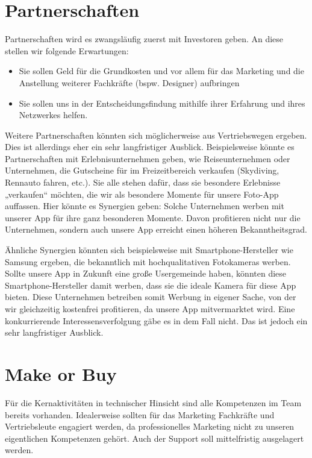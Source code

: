 \section{Partnerschaften}
Partnerschaften wird es zwangsläufig zuerst mit Investoren geben. An diese stellen wir folgende Erwartungen:
\begin{itemize}
\item Sie sollen Geld für die Grundkosten und vor allem für das Marketing und die Anstellung weiterer Fachkräfte (bspw. Designer) aufbringen
\item Sie sollen uns in der Entscheidungsfindung mithilfe ihrer Erfahrung und ihres Netzwerkes helfen.
\end{itemize}

Weitere Partnerschaften könnten sich möglicherweise aus Vertriebswegen ergeben. Dies ist allerdings eher ein sehr langfristiger Ausblick. Beispielsweise könnte es Partnerschaften mit Erlebnisunternehmen geben, wie Reiseunternehmen oder Unternehmen, die Gutscheine für im Freizeitbereich verkaufen (Skydiving, Rennauto fahren, etc.). Sie alle stehen dafür, dass sie besondere Erlebnisse „verkaufen“ möchten, die wir als besondere Momente für unsere Foto-App auffassen. Hier könnte es Synergien geben: Solche Unternehmen werben mit unserer App für ihre ganz besonderen Momente. Davon profitieren nicht nur die Unternehmen, sondern auch unsere App erreicht einen höheren Bekanntheitsgrad.

Ähnliche Synergien könnten sich beispielsweise mit Smartphone-Hersteller wie Samsung ergeben, die bekanntlich mit hochqualitativen Fotokameras werben. Sollte unsere App in Zukunft eine große Usergemeinde haben, könnten diese Smartphone-Hersteller damit werben, dass sie die ideale Kamera für diese App bieten. Diese Unternehmen betreiben somit Werbung in eigener Sache, von der wir gleichzeitig kostenfrei profitieren, da unsere App mitvermarktet wird. Eine konkurrierende Interessensverfolgung gäbe es in dem Fall nicht. Das ist jedoch ein sehr langfristiger Ausblick.


\section{Make or Buy}
Für die Kernaktivitäten in technischer Hinsicht sind alle Kompetenzen im Team bereits vorhanden. Idealerweise sollten für das Marketing Fachkräfte und Vertriebsleute engagiert werden, da professionelles Marketing nicht zu unseren eigentlichen Kompetenzen gehört. Auch der Support soll mittelfristig ausgelagert werden.


